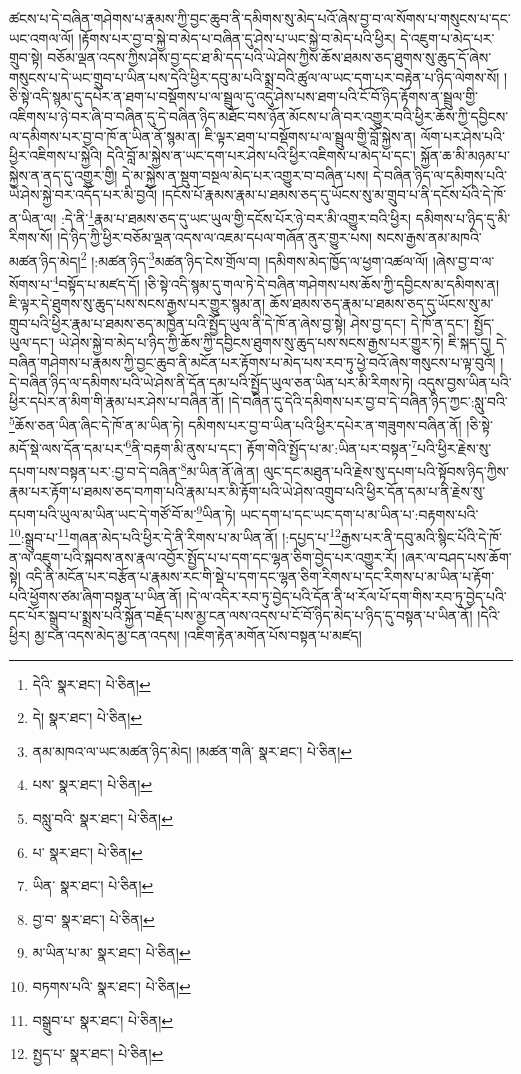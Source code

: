 ཚངས་པ་དེ་བཞིན་གཤེགས་པ་རྣམས་ཀྱི་བྱང་ཆུབ་ནི་དམིགས་སུ་མེད་པའོ་ཞེས་བྱ་བ་ལ་སོགས་པ་གསུངས་པ་དང་ཡང་འགལ་ལོ། །རྟོགས་པར་བྱ་བ་སྐྱེ་བ་མེད་པ་བཞིན་དུ་ཤེས་པ་ཡང་སྐྱེ་བ་མེད་པའི་ཕྱིར། དེ་འཇུག་པ་མེད་པར་གྲུབ་སྟེ། བཅོམ་ལྡན་འདས་ཀྱིས་ཤེས་བྱ་དང་ཐ་མི་དད་པའི་ཡེ་ཤེས་ཀྱིས་ཆོས་ཐམས་ཅད་ཐུགས་སུ་ཆུད་དོ་ཞེས་གསུངས་པ་དེ་ཡང་གྲུབ་པ་ཡིན་པས་དེའི་ཕྱིར་དབུ་མ་པའི་སྨྲ་བའི་ཚུལ་ལ་ཡང་དག་པར་བརྟེན་པ་ཉིད་ལེགས་སོ། །ཅི་སྟེ་འདི་སྙམ་དུ་དཔེར་ན་ཐག་པ་བསྡོགས་པ་ལ་སྦྲུལ་དུ་འདུ་ཤེས་པས་ཐག་པའི་ངོ་བོ་ཉིད་རྟོགས་ན་སྦྲུལ་གྱི་འཇིགས་པ་ཉེ་བར་ཞི་བ་བཞིན་དུ་དེ་བཞིན་ཉིད་མཐོང་བས་ཉོན་མོངས་པ་ཞི་བར་འགྱུར་བའི་ཕྱིར་ཆོས་ཀྱི་དབྱིངས་ལ་དམིགས་པར་བྱ་བ་ཁོ་ན་ཡིན་ནོ་སྙམ་ན། ཇི་ལྟར་ཐག་པ་བསྡོགས་པ་ལ་སྦྲུལ་གྱི་བློ་སྐྱེས་ན། ལོག་པར་ཤེས་པའི་ཕྱིར་འཇིགས་པ་སྐྱེའི། དེའི་བློ་མ་སྐྱེས་ན་ཡང་དག་པར་ཤེས་པའི་ཕྱིར་འཇིགས་པ་མེད་པ་དང་། སྐྱོན་ཆ་མི་མཉམ་པ་སྐྱེས་ན་ནད་དུ་འགྱུར་གྱི། དེ་མ་སྐྱེས་ན་སྡུག་བསྔལ་མེད་པར་འགྱུར་བ་བཞིན་པས། དེ་བཞིན་ཉིད་ལ་དམིགས་པའི་ཡེ་ཤེས་སྐྱེ་བར་འདོད་པར་མི་བྱའོ། །དངོས་པོ་རྣམས་རྣམ་པ་ཐམས་ཅད་དུ་ཡོངས་སུ་མ་གྲུབ་པ་ནི་དངོས་པོའི་དེ་ཁོ་ན་ཡིན་ལ། :དེ་ནི་\footnote{དེའི་  སྣར་ཐང་།  པེ་ཅིན། }རྣམ་པ་ཐམས་ཅད་དུ་ཡང་ཡུལ་གྱི་དངོས་པོར་ཉེ་བར་མི་འགྱུར་བའི་ཕྱིར། དམིགས་པ་ཉིད་དུ་མི་རིགས་སོ། །དེ་ཉིད་ཀྱི་ཕྱིར་བཅོམ་ལྡན་འདས་ལ་འཇམ་དཔལ་གཞོན་ནུར་གྱུར་པས། སངས་རྒྱས་ནམ་མཁའི་མཚན་ཉིད་མེད།\footnote{དེ།  སྣར་ཐང་།  པེ་ཅིན། } །:མཚན་ཉིད་\footnote{ནམ་མཁའ་ལ་ཡང་མཚན་ཉིད་མེད། །མཚན་གཞི་  སྣར་ཐང་།  པེ་ཅིན། }མཚན་ཉིད་ངེས་གྲོལ་བ། །དམིགས་མེད་ཁྱོད་ལ་ཕྱག་འཚལ་ལོ། །ཞེས་བྱ་བ་ལ་སོགས་པ་\footnote{པས་  སྣར་ཐང་།  པེ་ཅིན། }བསྟོད་པ་མཛད་དོ། །ཅི་སྟེ་འདི་སྙམ་དུ་གལ་ཏེ་དེ་བཞིན་གཤེགས་པས་ཆོས་ཀྱི་དབྱིངས་མ་དམིགས་ན། ཇི་ལྟར་དེ་ཐུགས་སུ་ཆུད་པས་སངས་རྒྱས་པར་གྱུར་སྙམ་ན། ཆོས་ཐམས་ཅད་རྣམ་པ་ཐམས་ཅད་དུ་ཡོངས་སུ་མ་གྲུབ་པའི་ཕྱིར་རྣམ་པ་ཐམས་ཅད་མཁྱེན་པའི་སྤྱོད་ཡུལ་ནི་དེ་ཁོ་ན་ཞེས་བྱ་སྟེ། ཤེས་བྱ་དང་། དེ་ཁོ་ན་དང་། སྤྱོད་ཡུལ་དང་། ཡེ་ཤེས་སྐྱེ་བ་མེད་པ་ཉིད་ཀྱི་ཆོས་ཀྱི་དབྱིངས་ཐུགས་སུ་ཆུད་པས་སངས་རྒྱས་པར་གྱུར་ཏེ། ཇི་སྐད་དུ། དེ་བཞིན་གཤེགས་པ་རྣམས་ཀྱི་བྱང་ཆུབ་ནི་མངོན་པར་རྟོགས་པ་མེད་པས་རབ་ཏུ་ཕྱེ་བའོ་ཞེས་གསུངས་པ་ལྟ་བུའོ། །དེ་བཞིན་ཉིད་ལ་དམིགས་པའི་ཡེ་ཤེས་ནི་དོན་དམ་པའི་སྤྱོད་ཡུལ་ཅན་ཡིན་པར་མི་རིགས་ཏེ། འདུས་བྱས་ཡིན་པའི་ཕྱིར་དཔེར་ན་མིག་གི་རྣམ་པར་ཤེས་པ་བཞིན་ནོ། །དེ་བཞིན་དུ་དེའི་དམིགས་པར་བྱ་བ་དེ་བཞིན་ཉིད་ཀྱང་:སླུ་བའི་\footnote{བསླུ་བའི་  སྣར་ཐང་།  པེ་ཅིན། }ཆོས་ཅན་ཡིན་ཞིང་དེ་ཁོ་ན་མ་ཡིན་ཏེ། དམིགས་པར་བྱ་བ་ཡིན་པའི་ཕྱིར་དཔེར་ན་གཟུགས་བཞིན་ནོ། །ཅི་སྟེ་མདོ་སྡེ་ལས་དོན་དམ་པར་\footnote{པ་  སྣར་ཐང་།  པེ་ཅིན། }ནི་བརྟག་མི་ནུས་པ་དང་། རྟོག་གེའི་སྤྱོད་པ་མ་:ཡིན་པར་བསྟན་\footnote{ཡིན་  སྣར་ཐང་།  པེ་ཅིན། }པའི་ཕྱིར་རྗེས་སུ་དཔག་པས་བསྟན་པར་:བྱ་བ་དེ་བཞིན་\footnote{བྱ་བ་  སྣར་ཐང་།  པེ་ཅིན། }མ་ཡིན་ནོ་ཞེ་ན། ལུང་དང་མཐུན་པའི་རྗེས་སུ་དཔག་པའི་སྟོབས་ཉིད་ཀྱིས་རྣམ་པར་རྟོག་པ་ཐམས་ཅད་བཀག་པའི་རྣམ་པར་མི་རྟོག་པའི་ཡེ་ཤེས་འགྲུབ་པའི་ཕྱིར་དོན་དམ་པ་ནི་རྗེས་སུ་དཔག་པའི་ཡུལ་མ་ཡིན་ཡང་དེ་གཙོ་བོ་མ་\footnote{མ་ཡིན་པ་མ་  སྣར་ཐང་།  པེ་ཅིན། }ཡིན་ཏེ། ཡང་དག་པ་དང་ཡང་དག་པ་མ་ཡིན་པ་:བརྟགས་པའི་\footnote{བཏགས་པའི་  སྣར་ཐང་།  པེ་ཅིན། }:སྒྲུབ་པ་\footnote{བསྒྲུབ་པ་  སྣར་ཐང་།  པེ་ཅིན། }གཞན་མེད་པའི་ཕྱིར་དེ་ནི་རིགས་པ་མ་ཡིན་ནོ། །:དཔྱད་པ་\footnote{སྤྱད་པ་  སྣར་ཐང་།  པེ་ཅིན། }རྒྱས་པར་ནི་དབུ་མའི་སྙིང་པོའི་དེ་ཁོ་ན་ལ་འཇུག་པའི་སྐབས་ནས་རྣལ་འབྱོར་སྤྱོད་པ་པ་དག་དང་ལྷན་ཅིག་བྱེད་པར་འགྱུར་རོ། །ཞར་ལ་བཤད་པས་ཆོག་སྟེ། འདི་ནི་མངོན་པར་བརྩོན་པ་རྣམས་རང་གི་སྡེ་པ་དག་དང་ལྷན་ཅིག་རིགས་པ་དང་རིགས་པ་མ་ཡིན་པ་རྟོག་པའི་ཕྱོགས་ཙམ་ཞིག་བསྟན་པ་ཡིན་ནོ། །དེ་ལ་འདིར་རབ་ཏུ་བྱེད་པའི་དོན་ནི་ཕ་རོལ་པོ་དག་གིས་རབ་ཏུ་བྱེད་པའི་དང་པོར་སྒྲུབ་པ་སྨྲས་པའི་སྐྱོན་བརྗོད་པས་མྱ་ངན་ལས་འདས་པ་ངོ་བོ་ཉིད་མེད་པ་ཉིད་དུ་བསྟན་པ་ཡིན་ནོ། །དེའི་ཕྱིར། མྱ་ངན་འདས་མེད་མྱ་ངན་འདས། །འཇིག་རྟེན་མགོན་པོས་བསྟན་པ་མཛད། 
